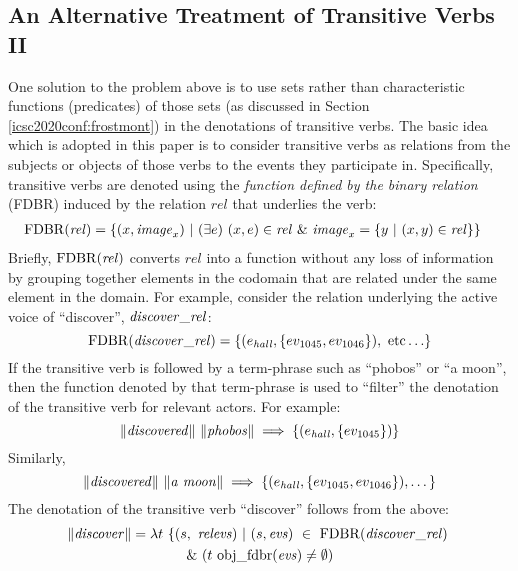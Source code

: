 \documentclass[../main.tex]{subfiles}
\begin{document}
\begin{refsection}
\subsection{An Alternative Treatment of Transitive Verbs II}
\label{icsc2020conf:altvbii}


One solution to the problem above is to use sets rather than characteristic functions (predicates) of those sets (as discussed in Section \ref{icsc2020conf:frostmont}) in the denotations of transitive verbs. The basic idea \cite{frost1989constructing} which is adopted in this paper is to consider transitive verbs as relations from the subjects or objects of those verbs to the events they participate in.
Specifically, transitive verbs are denoted using the {\em function defined by the binary relation} (FDBR) \cite{peelar2016accommodating} induced by the relation $\mathit{rel}$ that underlies the verb:
\begin{equation*}
	\begin{split}
		&\mathrm{FDBR}({\mathit{rel}}) = \{(x, \mathit{image}_x)\ | \ (\exists e)\ (x, e) \in \mathit{rel}\ \& \ \mathit{image}_x = \{ y\ |\ (x, y) \in \mathit{rel} \}  \}
	\end{split}
\end{equation*}
Briefly, $\mathrm{FDBR}({\mathit{rel}})$ converts $\mathit{rel}$ into a function without any loss of information by grouping together elements in the codomain that are related under the same element in the domain. For example, consider the relation underlying the active voice of ``discover'', $\mathit{discover\_rel}$:
\[ \FDBR{\relation{discover}} = \{(\entityassoc{\hall}, \{ \eventassoc{1045}, \eventassoc{1046} \} ),\ \mathrm{etc} \ldots \} \]
If the transitive verb is followed by a term-phrase such as ``phobos'' or ``a moon'', then
the function denoted by that term-phrase is used to ``filter'' the denotation of the transitive verb for relevant actors. For example:
\[ \lVert \mathit{discovered} \rVert \ \lVert \mathit{phobos} \rVert \implies \{ (e_{\mathit{hall}}, \{ ev_{\mathrm{1045}} \} ) \} \]
Similarly,
\[\meaningof{discovered} \ \meaningof{a\ moon} \implies \{ (\entityassoc{\hall}, \{ \eventassoc{1045}, \eventassoc{1046} \} ), \dots \} \]
\noindent The denotation of the transitive verb ``discover'' follows from the above:
\begin{multline*}
	\meaningof{discover} =
	\lambda t\ \{ (s,\ \mathit{relevs})\ |\ (s, \mathit{evs})\ \in\ \FDBR{\relation{discover}}\  \\
	\&\ (t\ \objfdbr{evs} \neq \emptyset)

\end{multline*}
\end{refsection}
\end{document}
